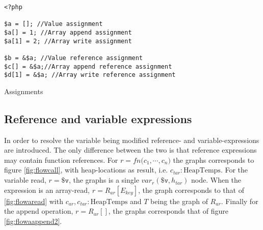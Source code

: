 \begin{figure}
{\begin{adjustbox}{max size={.24\textwidth}{.25\textheight}}
\end{adjustbox}}
\hspace*{\fill}
\end{figure}
\begin{program}
\begin{lstlisting}
<?php

$a = []; //Value assignment
$a[] = 1; //Array append assignment
$a[1] = 2; //Array write assignment

$b = &$a; //Value reference assignment
$c[] = &$a;//Array append reference assignment
$d[1] = &$a; //Array write reference assignment

\end{lstlisting}
\caption{Assignments}
\label{lst:assignments}
\end{program}

\subsection{Reference and variable expressions}
In order to resolve the variable being modified reference- and variable-expressions are introduced. The only difference between the two is that reference expressions may contain function references. For $r = fn \texttt{(}c_1, \cdots, c_n\texttt{)}$ the graphs corresponds to figure \ref{fig:flowcall}, with heap-locations as result, i.e. $c_{tar} : \text{HeapTemps}$. For the variable read, $r = \texttt{\$v}$, the graphs is a single $var_r(\texttt{\$v}, h_{tar})$ node. When the expression is an array-read, $r= R_{ar}[E_{key}]$, the graph corresponds to that of \ref{fig:flowaread} with $c_{ar},c_{tar} : \text{HeapTemps}$ and $T$ being the graph of $R_{ar}$. Finally for the append operation, $r = R_{ar}[]$, the graphs corresponds that of figure \ref{fig:flowaappend2}.

